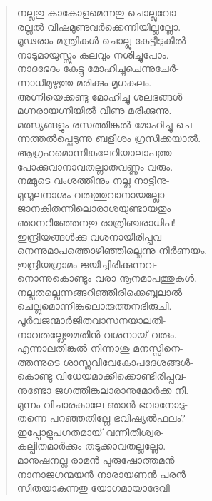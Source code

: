 \begin{verse}
നല്ലതു കാകോളമെന്നതു ചൊല്ലുവോ-\\
രല്ലല്‍ വിഷമുണ്ടവര്‍ക്കെന്നിയില്ലല്ലോ.\\
മൂഢരാം മന്ത്രികള്‍ ചൊല്ലു കേട്ടീടുകില്‍\\
നാടുമായുസ്സും കുലവും നശിച്ചുപോം.\\
നാദഭേദം കേട്ടു മോഹിച്ചുചെന്നുചേര്‍-\\
ന്നാധിമുഴുത്തു മരിക്കും മൃഗകുലം.\\
അഗ്നിയെക്കണ്ടു മോഹിച്ചു ശലഭങ്ങള്‍\\
മഗ്നരായഗ്നിയില്‍ വീണു മരിക്കുന്നു.\\
മത്സ്യങ്ങളും രസത്തിങ്കല്‍ മോഹിച്ചു ചെ-\\
ന്നത്തല്‍പ്പെടുന്നു ബളിശം ഗ്രസിക്കയാല്‍.\\
ആഗ്രഹമൊന്നിങ്കലേറിയാലാപത്തു\\
പോക്കുവാനാവതല്ലാതവണ്ണം വരും.\\
നമ്മുടെ വംശത്തിനും നല്ല നാട്ടിനു-\\
മുന്മൂലനാശം വരുത്തുവാനായല്ലോ\\
ജാനകിതന്നിലൊരാശയുണ്ടായതും\\
ഞാനറിഞ്ഞേനതു രാത്രിഞ്ചരാധിപ!\\
ഇന്ദ്രിയങ്ങള്‍ക്കു വശനായിരിപ്പവ-\\
നെന്നുമാപത്തൊഴിഞ്ഞില്ലെന്നു നിര്‍ണയം.\\
ഇന്ദ്രിയഗ്രാമം ജയിച്ചിരിക്കുന്നവ-\\
നൊന്നുകൊണ്ടും വരാ നൂനമാപത്തുകള്‍.\\
നല്ലതല്ലെന്നങ്ങറിഞ്ഞിരിക്കെബ്ബലാല്‍\\
ചെല്ലുമൊന്നിങ്കലൊരുത്തനഭിരുചി.\\
പൂര്‍വജന്മാര്‍ജിതവാസനയാലതി-\\
നാവതല്ലേതുമതിന്‍ വശനായ് വരും.\\
എന്നാലതിങ്കല്‍ നിന്നാശു മനസ്സിനെ-\\
ത്തന്നുടെ ശാസ്ത്രവിവേകോപദേശങ്ങള്‍-\\
കൊണ്ടു വിധേയമാക്കിക്കൊണ്ടിരിപ്പവ-\\
നുണ്ടോ ജഗത്തിങ്കലാരാനുമോര്‍ക്ക നീ.\\
മുന്നം വിചാരകാലേ ഞാന്‍ ഭവാനോടു-\\
തന്നെ പറഞ്ഞതില്ലേ ഭവിഷ്യല്‍ഫലം?\\
ഇപ്പോളുപഗതമായ് വന്നിതീശ്വര-\\
കല്പിതമാര്‍ക്കും തടുക്കാവതല്ലല്ലോ.\\
മാനുഷനല്ല രാമന്‍ പുരുഷോത്തമന്‍\\
നാനാജഗന്മയന്‍ നാരായണന്‍ പരന്‍\\
സീതയാകുന്നതു യോഗമായാദേവി\\

\end{verse}
